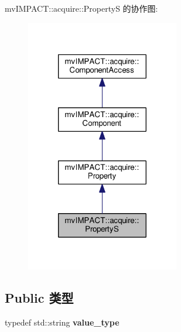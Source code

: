 mv\+I\+M\+P\+A\+C\+T\+:\+:acquire\+:\+:Property\+S 的协作图\+:
\nopagebreak
\begin{figure}[H]
\begin{center}
\leavevmode
\includegraphics[width=190pt]{classmv_i_m_p_a_c_t_1_1acquire_1_1_property_s__coll__graph}
\end{center}
\end{figure}
\subsection*{Public 类型}
\begin{DoxyCompactItemize}
\item 
\hypertarget{classmv_i_m_p_a_c_t_1_1acquire_1_1_property_s_a5f50a2d26c9e41e6aade5253a461accc}{typedef std\+::string {\bfseries value\+\_\+type}}\label{classmv_i_m_p_a_c_t_1_1acquire_1_1_property_s_a5f50a2d26c9e41e6aade5253a461accc}

\end{DoxyCompactItemize}
